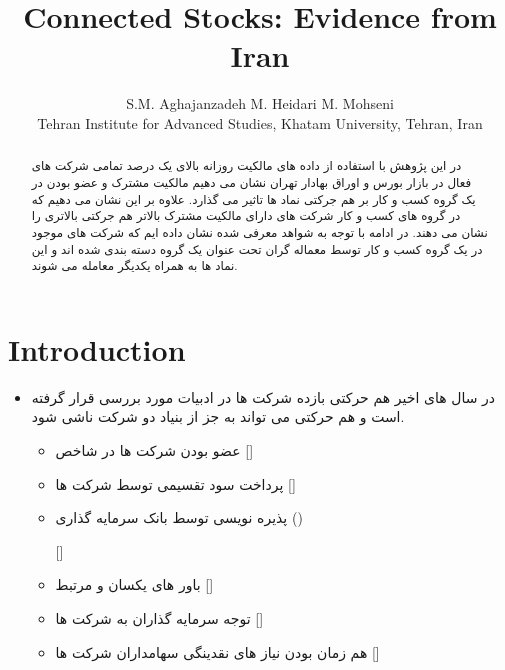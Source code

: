 \documentclass[12pt, a4paper]{article}
\title{Connected Stocks: Evidence from Iran}
\author{S.M. Aghajanzadeh\sym{*} \qquad M. Heidari\sym{*} \qquad M. Mohseni\sym{*} \\
\sym{*} \footnotesize  Tehran Institute for Advanced Studies, Khatam University, Tehran, Iran
}
\begin{document}
\maketitle


\begin{abstract}
در این پژوهش با استفاده از داده های مالکیت روزانه بالای یک درصد تمامی شرکت های فعال در بازار بورس و اوراق بهادار تهران نشان می دهیم مالکیت مشترک و عضو بودن در یک گروه کسب و کار بر هم جرکتی نماد ها تاثیر می گذارد. علاوه بر این نشان می دهیم که در گروه های کسب و کار شرکت های دارای مالکیت مشترک بالاتر هم جرکتی بالاتری را نشان می دهند. در ادامه با توجه به شواهد معرفی شده نشان داده ایم که شرکت های موجود در یک گروه کسب و کار توسط معماله گران تحت عنوان یک  گروه دسته بندی شده اند و این نماد ها به همراه یکدیگر معامله می شوند.
\end{abstract}





\section{Introduction}

\begin{itemize}
\item
 در سال های اخیر هم حرکتی بازده شرکت ها در ادبیات مورد بررسی قرار گرفته است و هم حرکتی می تواند به جز از بنیاد دو شرکت ناشی شود.
 \begin{itemize}
 \item 
 عضو بودن شرکت ها در شاخص
   []
   \item
    پرداخت سود تقسیمی توسط شرکت ها
  []  
  \item 
   پذیره نویسی توسط بانک سرمایه گذاری 
  ()
  
   []  
   \item
   باور های یکسان و مرتبط
   []  
      \item
      توجه سرمایه گذاران به شرکت ها
      []  
         \item
         هم زمان بودن نیاز های نقدینگی سهامداران شرکت ها
         []  
         
 \end{itemize}



\end{itemize}
\end{document}
